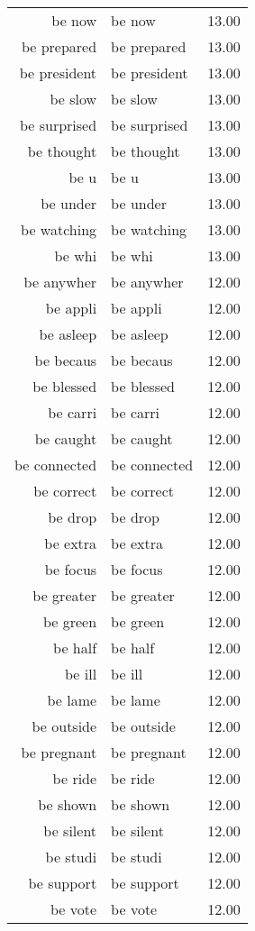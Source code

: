 \begin{table}[ht]
\begin{tabular}{rlr}
  be now & be now & 13.00 \\ 
  be prepared & be prepared & 13.00 \\ 
  be president & be president & 13.00 \\ 
  be slow & be slow & 13.00 \\ 
  be surprised & be surprised & 13.00 \\ 
  be thought & be thought & 13.00 \\ 
  be u & be u & 13.00 \\ 
  be under & be under & 13.00 \\ 
  be watching & be watching & 13.00 \\ 
  be whi & be whi & 13.00 \\ 
  be anywher & be anywher & 12.00 \\ 
  be appli & be appli & 12.00 \\ 
  be asleep & be asleep & 12.00 \\ 
  be becaus & be becaus & 12.00 \\ 
  be blessed & be blessed & 12.00 \\ 
  be carri & be carri & 12.00 \\ 
  be caught & be caught & 12.00 \\ 
  be connected & be connected & 12.00 \\ 
  be correct & be correct & 12.00 \\ 
  be drop & be drop & 12.00 \\ 
  be extra & be extra & 12.00 \\ 
  be focus & be focus & 12.00 \\ 
  be greater & be greater & 12.00 \\ 
  be green & be green & 12.00 \\ 
  be half & be half & 12.00 \\ 
  be ill & be ill & 12.00 \\ 
  be lame & be lame & 12.00 \\ 
  be outside & be outside & 12.00 \\ 
  be pregnant & be pregnant & 12.00 \\ 
  be ride & be ride & 12.00 \\ 
  be shown & be shown & 12.00 \\ 
  be silent & be silent & 12.00 \\ 
  be studi & be studi & 12.00 \\ 
  be support & be support & 12.00 \\ 
  be vote & be vote & 12.00 \\ 

\end{tabular}
\end{table}
